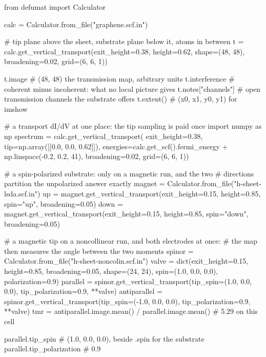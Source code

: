 \documentclass[11pt,a4paper]{article}
\begin{document}
\begin{pycode}
from defumat import Calculator

calc = Calculator.from_file("graphene.scf.in")

# tip plane above the sheet, substrate plane below it, atoms in between
t = calc.get_vertical_transport(exit_height=0.38, height=0.62,
                                shape=(48, 48), broadening=0.02,
                                grid=(6, 6, 1))

t.image            # (48, 48) the transmission map, arbitrary units
t.interference     # coherent minus incoherent: what no local picture gives
t.notes["channels"]  # open transmission channels the substrate offers
t.extent()         # (x0, x1, y0, y1) for imshow

# a transport dI/dV at one place: the tip sampling is paid once
import numpy as np
spectrum = calc.get_vertical_transport(
    exit_height=0.38, tip=np.array([[0.0, 0.0, 0.62]]),
    energies=calc.get_scf().fermi_energy + np.linspace(-0.2, 0.2, 41),
    broadening=0.02, grid=(6, 6, 1))

# a spin-polarized substrate: only on a magnetic run, and the two
# directions partition the unpolarized answer exactly
magnet = Calculator.from_file("h-sheet-lsda.scf.in")
up = magnet.get_vertical_transport(exit_height=0.15, height=0.85,
                                   spin="up", broadening=0.05)
down = magnet.get_vertical_transport(exit_height=0.15, height=0.85,
                                     spin="down", broadening=0.05)

# a magnetic tip on a noncollinear run, and both electrodes at once:
# the map then measures the angle between the two moments
spinor = Calculator.from_file("h-sheet-noncolin.scf.in")
valve = dict(exit_height=0.15, height=0.85, broadening=0.05,
             shape=(24, 24), spin=(1.0, 0.0, 0.0), polarization=0.9)
parallel = spinor.get_vertical_transport(tip_spin=(1.0, 0.0, 0.0),
                                         tip_polarization=0.9, **valve)
antiparallel = spinor.get_vertical_transport(tip_spin=(-1.0, 0.0, 0.0),
                                             tip_polarization=0.9, **valve)
tmr = antiparallel.image.mean() / parallel.image.mean()   # 5.29 on this cell

parallel.tip_spin           # (1.0, 0.0, 0.0), beside .spin for the substrate
parallel.tip_polarization   # 0.9
\end{pycode}
\end{document}
